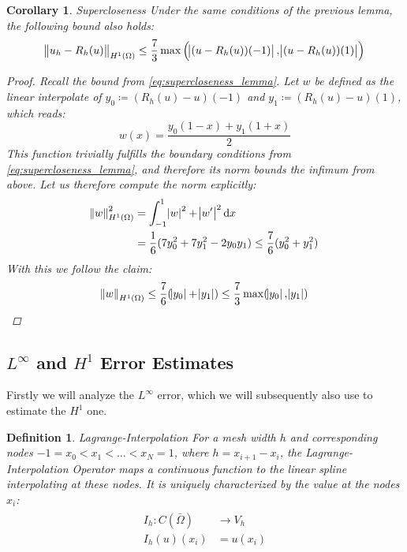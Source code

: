 \documentclass[headsepline,footsepline,footinclude=false,oneside,fontsize=11pt,paper=a4,listof=totoc,bibliography=totoc]{scrbook} %
\newtheorem{definition}{Definition}
\newtheorem{corollary}{Corollary}
\begin{document}
\begin{corollary} Supercloseness \newline
	Under the same conditions of the previous lemma, the following bound also holds:
	\begin{equation}\label{eq:supercloseness}
	\norm{u_h - R_h(u)}_{H^1(\Omega)} \leq \frac{7}{3} \max \left(\abs{(u-R_h(u))(-1)}, \abs{(u-R_h(u))(1)}\right)
	\end{equation}
	\begin{proof}
		Recall the bound from \eqref{eq:supercloseness_lemma}. Let $w$ be defined as the linear interpolate of $y_0 \coloneqq (R_h(u) - u)(-1)$ and $y_1 \coloneqq (R_h(u) - u)(1)$, which reads:
		\begin{equation}
		w(x) = \frac{y_0(1-x)+y_1(1+x)}{2}
		\end{equation}
		This function trivially fulfills the boundary conditions from \eqref{eq:supercloseness_lemma}, and therefore its norm bounds the infimum from above.
		Let us therefore compute the norm explicitly:
		\begin{align*}
		\norm{w}_{H^1(\Omega)}^2 &= \int_{-1}^1{\abs{w}^2 + \abs{w'}^2} \dif x\\
		&= \frac{1}{6}(7y_0^2 + 7 y_1^2 - 2y_0y_1)  \leq \frac{7}{6} (y_0^2 + y_1^2)
		\end{align*}
		With this we follow the claim:
		\begin{align*}
		\norm{w}_{H^1(\Omega)} \leq \frac{7}{6} (\abs{y_0} + \abs{y_1}) \leq \frac{7}{3} \max(\abs{y_0}, \abs{y_1})
		\end{align*}
	\end{proof}
\end{corollary}

\subsection{$L^{\infty}$ and $H^1$ Error Estimates}

Firstly we will analyze the $L^{\infty}$ error, which we will subsequently also use to estimate the $H^1$ one.

\begin{definition} Lagrange-Interpolation \newline
	For a mesh width $h$ and corresponding nodes $-1=x_0<x_1<\dots<x_N = 1$, where $h = x_{i+1} - x_i$, the Lagrange-Interpolation Operator maps a continuous function to the linear spline interpolating at these nodes. It is uniquely characterized by the value at the nodes $x_i$:
	\begin{align}
	\begin{split}
	I_h : C(\bar{\Omega}) &\rightarrow V_h \\
	I_h(u)(x_i) &= u(x_i)
	\end{split}
	\end{align}
\end{definition}
\end{document}
